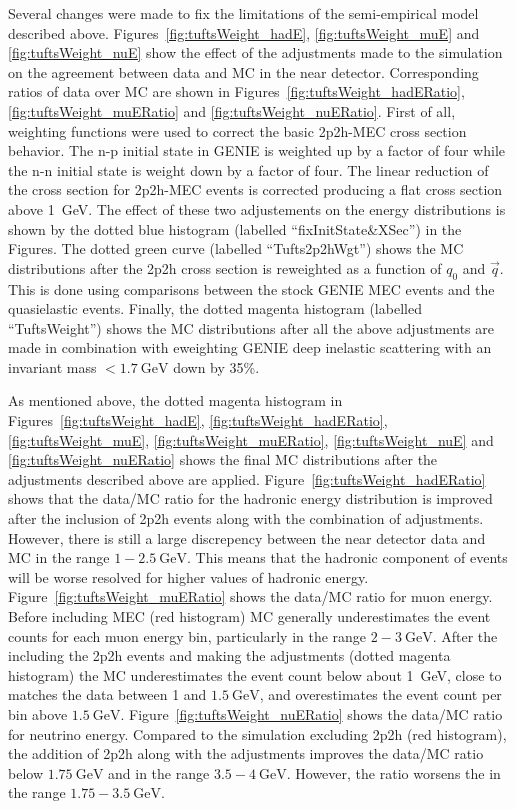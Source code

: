 Several changes were made to fix the limitations of the semi-empirical
model described above.
Figures~\ref{fig:tuftsWeight_hadE}, \ref{fig:tuftsWeight_muE} and
\ref{fig:tuftsWeight_nuE} show the effect of the adjustments made to
the simulation on the agreement between data and MC in the near
detector. Corresponding ratios of data over MC are shown in
Figures~\ref{fig:tuftsWeight_hadERatio}, \ref{fig:tuftsWeight_muERatio} and
\ref{fig:tuftsWeight_nuERatio}.  
First of all, weighting functions were used to correct the basic
2p2h-MEC cross section behavior.  
The n-p initial state in GENIE is weighted up by a factor of four
while the n-n initial state is weight down by a factor of four.
The linear reduction of the cross section for 2p2h-MEC events is
corrected producing a flat cross section above 1~GeV. The effect of
these two adjustements on the energy distributions is shown by the
dotted blue histogram (labelled ``fixInitState\&XSec'') in the Figures.
The dotted green curve (labelled ``Tufts2p2hWgt'') shows the MC
distributions after the 2p2h cross section is reweighted as a function
of $q_0$ and $\vec{q}$. 
This is done using comparisons between the stock GENIE MEC events and
the quasielastic events.
Finally, the dotted magenta histogram (labelled ``TuftsWeight'') shows
the MC distributions after all the above adjustments are made in
combination with eweighting GENIE deep inelastic scattering with an
invariant mass $< 1.7~\text{GeV}$ down by 35\%.~\cite{tuftsWeightNote}

As mentioned above, the dotted magenta histogram in
Figures~\ref{fig:tuftsWeight_hadE}, \ref{fig:tuftsWeight_hadERatio},
\ref{fig:tuftsWeight_muE}, \ref{fig:tuftsWeight_muERatio},
\ref{fig:tuftsWeight_nuE} and \ref{fig:tuftsWeight_nuERatio} shows the
final MC distributions after the adjustments described above are
applied. 
Figure~\ref{fig:tuftsWeight_hadERatio} shows that the data/MC
ratio for the hadronic energy distribution is improved after the
inclusion of 2p2h events along with the combination of
adjustments. However, there is still a large discrepency between the
near detector data and MC in the range $1 - 2.5~\text{GeV}$. This
means that the hadronic component of events will be worse resolved for
higher values of hadronic energy. 
Figure~\ref{fig:tuftsWeight_muERatio} shows the data/MC ratio for muon
energy. Before including MEC (red histogram) MC generally
underestimates the event counts for each muon energy bin, particularly
in the range $2-3~\text{GeV}$. After the including the 2p2h events and
making the adjustments (dotted magenta histogram) the MC
underestimates the event count below about 1~GeV, close to matches the
data between 1 and $1.5~\text{GeV}$, and overestimates the event count
per bin above $1.5~\text{GeV}$.
Figure~\ref{fig:tuftsWeight_nuERatio} shows the data/MC ratio for
neutrino energy. Compared to the simulation excluding 2p2h (red
histogram), the addition of 2p2h along with the adjustments 
improves the data/MC ratio below $1.75~\text{GeV}$ and in the range
$3.5 - 4~\text{GeV}$. However, the ratio worsens the in the range
$1.75 - 3.5~\text{GeV}$.


